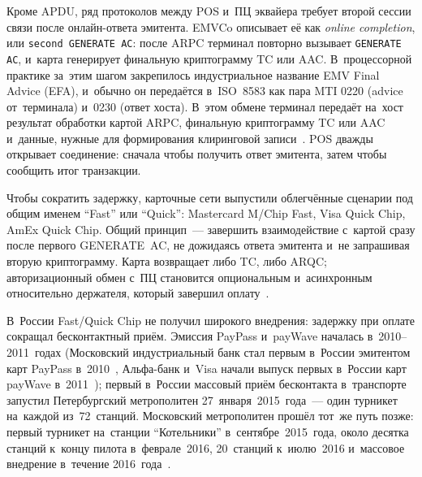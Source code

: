 Кроме APDU, ряд протоколов между POS и~ПЦ эквайера требует второй сессии связи
после онлайн-ответа эмитента. EMVCo описывает её как \textit{online completion},
или \texttt{second GENERATE AC}: после ARPC терминал повторно вызывает \texttt{GENERATE AC},
и~карта генерирует финальную криптограмму TC или AAC. В~процессорной практике
за~этим шагом закрепилось индустриальное название EMV Final Advice (EFA),
и~обычно он передаётся в~ISO~8583 как пара MTI 0220 (advice
от~терминала) и~0230 (ответ хоста). В~этом обмене терминал передаёт на~хост
результат обработки картой ARPC, финальную
криптограмму TC или AAC и~данные, нужные для формирования клиринговой
записи~\cite{emvco-book4}.
POS дважды открывает соединение: сначала чтобы получить ответ эмитента, затем
чтобы сообщить итог транзакции.

Чтобы сократить задержку, карточные сети выпустили облегчённые сценарии под
общим именем \enquote{Fast} или \enquote{Quick}: Mastercard M/Chip Fast, Visa
Quick Chip, AmEx Quick Chip. Общий принцип~--- завершить взаимодействие
с~картой сразу после первого GENERATE~AC, не дожидаясь ответа эмитента
и~не запрашивая вторую криптограмму. Карта возвращает либо TC, либо ARQC;
авторизационный обмен с~ПЦ становится опциональным и~асинхронным относительно
держателя, который завершил оплату~\cite{visa-tadg,mc-tpr}.

В~России Fast/Quick Chip не получил широкого внедрения: задержку при оплате
сокращал бесконтактный приём. Эмиссия PayPass и~payWave началась
в~2010--2011~годах (Московский индустриальный банк стал первым в~России эмитентом
  карт PayPass в~2010~\cite{cnews-minb-paypass-2011}, Альфа-банк и~Visa начали выпуск первых
в~России карт payWave в~2011~\cite{asros-alfa-paywave-2011}); первый в~России массовый приём бесконтакта в~транспорте запустил
Петербургский метрополитен 27~января~2015~года~--- один турникет на~каждой
из~72~станций. Московский метрополитен прошёл тот~же путь позже: первый
турникет на~станции \enquote{Котельники} в~сентябре~2015~года, около десятка
станций к~концу пилота в~феврале~2016, 20~станций к~июлю~2016 и~массовое
внедрение в~течение 2016~года~\cite{spb-paypass-metro-2015,mos-paypass-metro-2016,mos-metro-paypass-20-stations-2016}.

